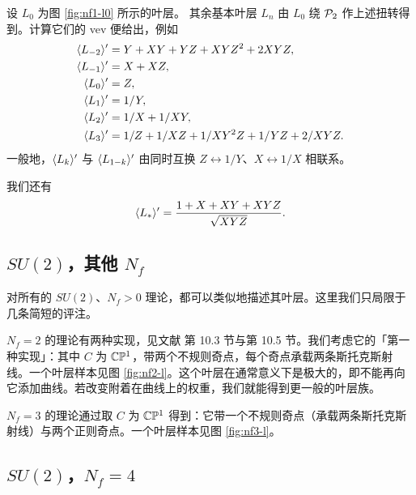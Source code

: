 设 $L_0$ 为图 \ref{fig:nf1-l0} 所示的叶层。
其余基本叶层 $L_n$ 由 $L_0$ 绕 $\mathcal{P}_2$ 作上述扭转得到。计算它们的 vev 便给出，例如
\begin{align}
 \langle L_{-2} \rangle' &= Y + XY + YZ + X Y Z^2 + 2 XYZ, \\
 \langle L_{-1} \rangle' &= X + XZ, \\
 \langle L_{0} \rangle' &= Z, \\
 \langle L_{1} \rangle' &= 1/Y, \\
 \langle L_{2} \rangle' &= 1/X + 1/XY, \\
 \langle L_3 \rangle' &= 1/Z + 1/XZ + 1/X Y^2 Z + 1/YZ + 2/XYZ.
\end{align}
一般地，$\langle L_k \rangle'$ 与 $\langle L_{1-k} \rangle'$ 由同时互换 $Z \leftrightarrow 1/Y$、$X \leftrightarrow 1/X$ 相联系。

我们还有
\begin{equation}
\langle L_* \rangle' = \frac{1 + X + XY + XYZ}{\sqrt{XYZ}}.
\end{equation}

\subsection{$SU(2)$，其他 $N_f$}

对所有的 $SU(2)$、$N_f > 0$ 理论，都可以类似地描述其叶层。这里我们只局限于几条简短的评注。

$N_f=2$ 的理论有两种实现，见文献 \cite{Gaiotto:2009hg} 第 10.3 节与第 10.5 节。我们考虑它的「第一种实现」：其中 $C$ 为 $\mathbb{C}\mathbb{P}^1$，带两个不规则奇点，每个奇点承载两条斯托克斯射线。一个叶层样本见图 \ref{fig:nf2-l}。这个叶层在通常意义下是极大的，即不能再向它添加曲线。若改变附着在曲线上的权重，我们就能得到更一般的叶层族。

$N_f = 3$ 的理论通过取 $C$ 为 $\mathbb{C}\mathbb{P}^1$ 得到：它带一个不规则奇点（承载两条斯托克斯射线）与两个正则奇点。一个叶层样本见图 \ref{fig:nf3-l}。

\subsection{$SU(2)$，$N_f = 4$}


